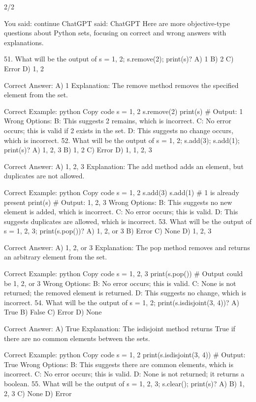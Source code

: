 2/2

You said:
continue
ChatGPT said:
ChatGPT
Here are more objective-type questions about Python sets, focusing on correct and wrong answers with explanations.

51. What will be the output of s = {1, 2}; s.remove(2); print(s)?
A) {1}
B) {2}
C) Error
D) {1, 2}

Correct Answer: A) {1}
Explanation: The remove method removes the specified element from the set.

Correct Example:
python
Copy code
s = {1, 2}
s.remove(2)
print(s)  # Output: {1}
Wrong Options:
B: This suggests 2 remains, which is incorrect.
C: No error occurs; this is valid if 2 exists in the set.
D: This suggests no change occurs, which is incorrect.
52. What will be the output of s = {1, 2}; s.add(3); s.add(1); print(s)?
A) {1, 2, 3}
B) {1, 2}
C) Error
D) {1, 1, 2, 3}

Correct Answer: A) {1, 2, 3}
Explanation: The add method adds an element, but duplicates are not allowed.

Correct Example:
python
Copy code
s = {1, 2}
s.add(3)
s.add(1)  # 1 is already present
print(s)  # Output: {1, 2, 3}
Wrong Options:
B: This suggests no new element is added, which is incorrect.
C: No error occurs; this is valid.
D: This suggests duplicates are allowed, which is incorrect.
53. What will be the output of s = {1, 2, 3}; print(s.pop())?
A) 1, 2, or 3
B) Error
C) None
D) {1, 2, 3}

Correct Answer: A) 1, 2, or 3
Explanation: The pop method removes and returns an arbitrary element from the set.

Correct Example:
python
Copy code
s = {1, 2, 3}
print(s.pop())  # Output could be 1, 2, or 3
Wrong Options:
B: No error occurs; this is valid.
C: None is not returned; the removed element is returned.
D: This suggests no change, which is incorrect.
54. What will be the output of s = {1, 2}; print(s.isdisjoint({3, 4}))?
A) True
B) False
C) Error
D) None

Correct Answer: A) True
Explanation: The isdisjoint method returns True if there are no common elements between the sets.

Correct Example:
python
Copy code
s = {1, 2}
print(s.isdisjoint({3, 4}))  # Output: True
Wrong Options:
B: This suggests there are common elements, which is incorrect.
C: No error occurs; this is valid.
D: None is not returned; it returns a boolean.
55. What will be the output of s = {1, 2, 3}; s.clear(); print(s)?
A) {}
B) {1, 2, 3}
C) None
D) Error


